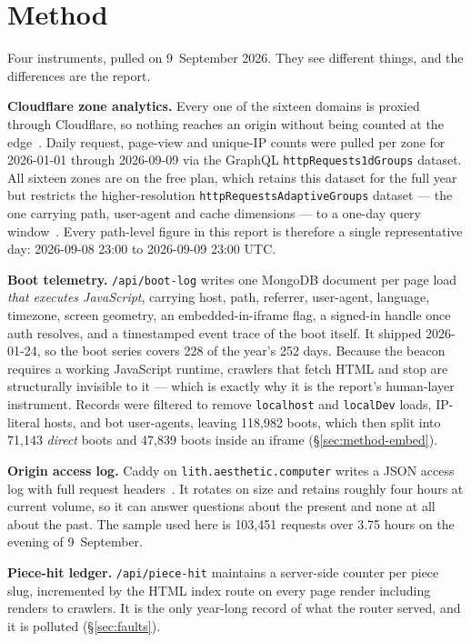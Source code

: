 \documentclass[10pt,letterpaper,twocolumn]{article}
\begin{document}
\section{Method}
\label{sec:method}

Four instruments, pulled on 9~September 2026. They see different things,
and the differences are the report.

\textbf{Cloudflare zone analytics.} Every one of the sixteen domains is
proxied through Cloudflare, so nothing reaches an origin without being
counted at the edge~\citep{cloudflare2026graphql}. Daily request,
page-view and unique-IP counts were pulled per zone for
2026-01-01 through 2026-09-09 via the GraphQL
\texttt{httpRequests1dGroups} dataset. All sixteen zones are on the free
plan, which retains this dataset for the full year but restricts the
higher-resolution \texttt{httpRequestsAdaptiveGroups} dataset --- the one
carrying path, user-agent and cache
dimensions --- to a one-day query window~\citep{cloudflare2026datasets}.
Every path-level figure in this report is therefore a single
representative day: 2026-09-08 23:00 to 2026-09-09 23:00 UTC.

\textbf{Boot telemetry.} \texttt{/api/boot-log} writes one MongoDB
document per page load \emph{that executes JavaScript}, carrying host,
path, referrer, user-agent, language, timezone, screen geometry, an
embedded-in-iframe flag, a signed-in handle once auth resolves, and a
timestamped event trace of the boot itself. It shipped 2026-01-24, so
the boot series covers 228 of the year's 252 days. Because the beacon
requires a working JavaScript runtime, crawlers that fetch HTML and
stop are structurally invisible to it --- which is exactly why it is the
report's human-layer instrument. Records were filtered to remove
\texttt{localhost} and \texttt{localDev} loads, IP-literal hosts, and
bot user-agents, leaving 118,982 boots, which then split into 71,143
\emph{direct} boots and 47,839 boots inside an iframe
(\S\ref{sec:method-embed}).

\textbf{Origin access log.} Caddy on \texttt{lith.aesthetic.computer}
writes a JSON access log with full request headers~\citep{caddy2026log}.
It rotates on size and retains roughly four hours at current volume, so
it can answer questions about the present and none at all about the
past. The sample used here is 103,451 requests over 3.75 hours on the
evening of 9~September.

\textbf{Piece-hit ledger.} \texttt{/api/piece-hit} maintains a
server-side counter per piece slug, incremented by the HTML index route
on every page render including renders to crawlers. It is the only
year-long record of what the router served, and it is polluted (\S\ref{sec:faults}).
\end{document}
